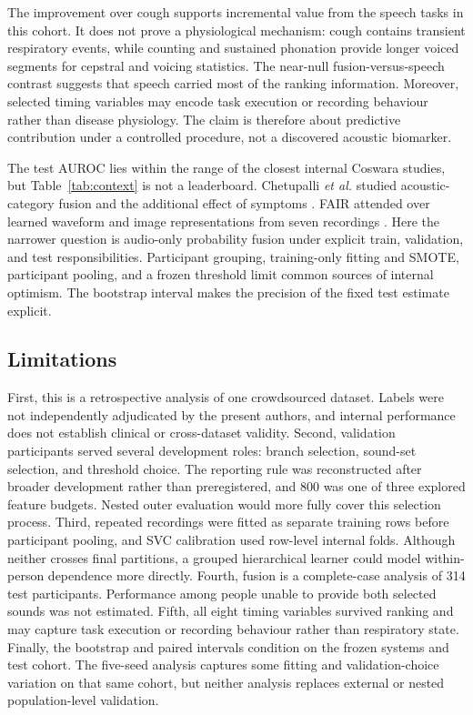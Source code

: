 \documentclass[conference]{IEEEtran}
\begin{document}
The improvement over cough supports incremental value from the speech tasks in
this cohort. It does not prove a physiological mechanism: cough contains
transient respiratory events, while counting and sustained phonation provide
longer voiced segments for cepstral and voicing statistics. The near-null
fusion-versus-speech contrast suggests that speech carried most of the ranking
information. Moreover, selected timing variables may encode task execution or
recording behaviour rather than disease physiology. The claim is therefore
about predictive contribution under a controlled procedure, not a discovered
acoustic biomarker.

The test AUROC lies within the range of the closest internal Coswara studies,
but Table~\ref{tab:context} is not a leaderboard. Chetupalli \emph{et al.}
studied acoustic-category fusion and the additional effect of symptoms
\cite{chetupalli2023multimodal}. FAIR attended over learned waveform and image
representations from seven recordings \cite{truong2024fair}. Here the narrower
question is audio-only probability fusion under explicit train, validation, and
test responsibilities. Participant grouping, training-only fitting and SMOTE,
participant pooling, and a frozen threshold limit common sources of internal
optimism. The bootstrap interval makes the precision of the fixed test estimate
explicit.

\subsection{Limitations}

First, this is a retrospective analysis of one crowdsourced dataset. Labels
were not independently adjudicated by the present authors, and internal
performance does not establish clinical or cross-dataset validity. Second,
validation participants served several development roles: branch selection,
sound-set selection, and threshold choice. The reporting rule was reconstructed
after broader development rather than preregistered, and 800 was one of three
explored feature budgets. Nested outer evaluation would more fully cover this
selection process. Third, repeated recordings were fitted as separate training
rows before participant pooling, and SVC calibration used row-level internal
folds. Although neither crosses final partitions, a grouped hierarchical
learner could model within-person dependence more directly. Fourth, fusion is a complete-case analysis of 314 test
participants. Performance among people unable to provide both selected sounds
was not estimated. Fifth, all eight timing variables survived ranking and may
capture task execution or recording behaviour rather than respiratory state.
Finally, the bootstrap and paired intervals condition on the frozen systems and
test cohort. The five-seed analysis captures some fitting and validation-choice
variation on that same cohort, but neither analysis replaces external or nested
population-level validation.
\end{document}
